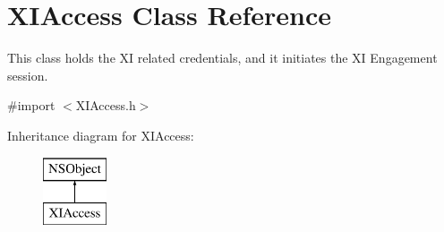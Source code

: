 \hypertarget{class_x_i_access}{}\section{X\+I\+Access Class Reference}
\label{class_x_i_access}


This class holds the XI related credentials, and it initiates the XI Engagement session.  




{\ttfamily \#import $<$X\+I\+Access.\+h$>$}

Inheritance diagram for X\+I\+Access\+:\begin{figure}[H]
\begin{center}
\leavevmode
\includegraphics[height=2.000000cm]{class_x_i_access}
\end{center}
\end{figure}
